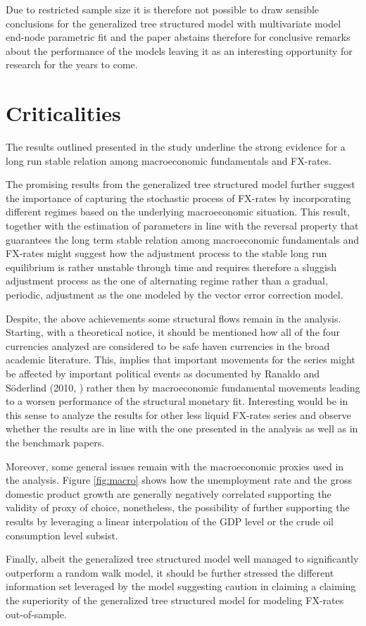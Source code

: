 Due to restricted sample size it is therefore not possible to draw
sensible conclusions for the generalized tree structured model with
multivariate model end-node parametric fit and the paper abstains
therefore for conclusive remarks about the performance of the models
leaving it as an interesting opportunity for research for the years to
come.

\section{Criticalities}

The results outlined presented in the study underline the strong
evidence for a long run stable relation among macroeconomic
fundamentals and FX-rates.

The promising results from the generalized tree structured model
further suggest the importance of capturing the stochastic process of
FX-rates by incorporating different regimes based on the underlying
macroeconomic situation. This result, together with the estimation of
parameters in line with the reversal property that guarantees the long
term stable relation among macroeconomic fundamentals and FX-rates
might suggest how the adjustment process to the stable long run
equilibrium is rather unstable through time and requires therefore a
sluggish adjustment process as the one of alternating regime rather
than a gradual, periodic, adjustment as the one modeled by the
vector error correction model.

Despite, the above achievements some structural flows remain in the
analysis. Starting, with a theoretical notice, it should be mentioned
how all of the four currencies analyzed are considered to be safe haven
currencies in the broad academic literature. This, implies that
important movements for the series might be affected by important
political events as documented by Ranaldo and S{\"o}derlind (2010,
\cite{RanaldoSoderlind}) rather then by macroeconomic fundamental
movements leading to a worsen performance of the structural monetary
fit. Interesting would be in this sense to analyze the results for
other less liquid FX-rates series and observe whether the results are
in line with the one presented in the analysis as well as in the
benchmark papers.

Moreover, some general issues remain with the macroeconomic proxies
used in the analysis. Figure \ref{fig:macro} shows how the
unemployment rate and the gross domestic product growth are generally
negatively correlated supporting the validity of proxy of choice,
nonetheless, the possibility of further supporting the results by
leveraging a linear interpolation of the GDP level or the crude oil
consumption level subsist. 

Finally, albeit the generalized tree structured model well managed to
significantly outperform a random walk model, it should be further
stressed the different information set leveraged by the model
suggesting caution in claiming a claiming the superiority of the
generalized tree structured model for modeling FX-rates
out-of-sample.




